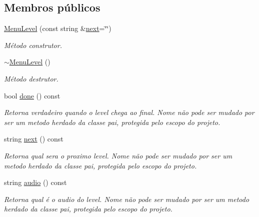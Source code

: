 \subsection*{Membros públicos}
\begin{DoxyCompactItemize}
\item 
\mbox{\hyperlink{classMenuLevel_a207c59fd8fdbb6252bdbbe0d8f73fcf6}{Menu\+Level}} (const string \&\mbox{\hyperlink{classMenuLevel_ae646a2eb4d55628aef9bd9a2e0ca66d6}{next}}=\char`\"{}\char`\"{})
\begin{DoxyCompactList}\small\item\em Método construtor. \end{DoxyCompactList}\item 
\mbox{\label{classMenuLevel_a6d5b3c8f7e8b45a597ca523ee37ac74a}} 
\mbox{\hyperlink{classMenuLevel_a6d5b3c8f7e8b45a597ca523ee37ac74a}{$\sim$\+Menu\+Level}} ()
\begin{DoxyCompactList}\small\item\em Método destrutor. \end{DoxyCompactList}\item 
bool \mbox{\hyperlink{classMenuLevel_a2d5ce9ee9de62719ca8225509f0e53b3}{done}} () const
\begin{DoxyCompactList}\small\item\em Retorna verdadeiro quando o level chega ao final. Nome não pode ser mudado por ser um metodo herdado da classe pai, protegida pelo escopo do projeto. \end{DoxyCompactList}\item 
string \mbox{\hyperlink{classMenuLevel_ae646a2eb4d55628aef9bd9a2e0ca66d6}{next}} () const
\begin{DoxyCompactList}\small\item\em Retorna qual sera o proximo level. Nome não pode ser mudado por ser um metodo herdado da classe pai, protegida pelo escopo do projeto. \end{DoxyCompactList}\item 
string \mbox{\hyperlink{classMenuLevel_a3293e74cafcf37c8d2b7cf79ded54d37}{audio}} () const
\begin{DoxyCompactList}\small\item\em Retorna qual é o audio do level. Nome não pode ser mudado por ser um metodo herdado da classe pai, protegida pelo escopo do projeto. \end{DoxyCompactList}\end{DoxyCompactItemize}
